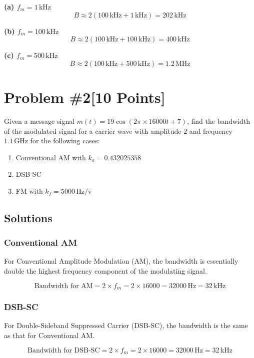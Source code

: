\documentclass{article}
\begin{document}
\textbf{(a) \( f_m = 1 \, \text{kHz} \)}
\[
B \approx 2(100 \, \text{kHz} + 1 \, \text{kHz}) = 202 \, \text{kHz}
\]

\textbf{(b) \( f_m = 100 \, \text{kHz} \)}
\[
B \approx 2(100 \, \text{kHz} + 100 \, \text{kHz}) = 400 \, \text{kHz}
\]

\textbf{(c) \( f_m = 500 \, \text{kHz} \)}
\[
B \approx 2(100 \, \text{kHz} + 500 \, \text{kHz}) = 1.2 \, \text{MHz}
\]

\newpage
\section*{Problem \#2[10 Points]}
Given a message signal \( m(t) = 19 \cos(2\pi \times 16000 t + 7) \), find the bandwidth of the modulated signal for a carrier wave with amplitude \( 2 \) and frequency \( 1.1 \, \text{GHz} \) for the following cases:

\begin{enumerate}
  \item Conventional AM with \( k_a = 0.432025358 \)
  \item DSB-SC
  \item FM with \( k_f = 5000 \, \text{Hz/v} \)
\end{enumerate}

\subsection*{Solutions}

\subsubsection*{Conventional AM}

For Conventional Amplitude Modulation (AM), the bandwidth is essentially double the highest frequency component of the modulating signal.

\[
\text{Bandwidth for AM} = 2 \times f_m = 2 \times 16000 = 32000 \, \text{Hz} = 32 \, \text{kHz}
\]

\subsubsection*{DSB-SC}

For Double-Sideband Suppressed Carrier (DSB-SC), the bandwidth is the same as that for Conventional AM.

\[
\text{Bandwidth for DSB-SC} = 2 \times f_m = 2 \times 16000 = 32000 \, \text{Hz} = 32 \, \text{kHz}
\]
\end{document}
